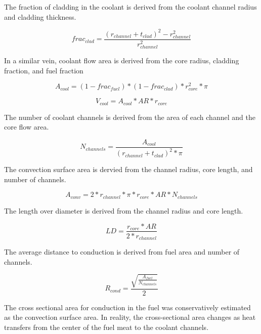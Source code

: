 The fraction of cladding in the coolant is derived from the coolant channel
radius and cladding thickness.

\begin{equation}
    frac_{clad} = \frac{(r_{channel} + t_{clad})^2 - r_{channel}^2}{r_{channel}^2} 
\end{equation}

In a similar vein, coolant flow area is derived from the core radius, cladding
fraction, and fuel fraction

\begin{equation}
    A_{cool} = (1-frac_{fuel})*(1-frac_{clad})*r_{core}^2*\pi
\end{equation}

\begin{equation}
    V_{cool} = A_{cool}*AR*r_{core}
\end{equation}

The number of coolant channels is derived from the area of each channel and the
core flow area.

\begin{equation}
    N_{channels} = \frac{A_{cool}}{(r_{channel} + t_{clad})^2 * \pi}
\end{equation}

The convection surface area is dervied from the channel radius, core length, and
number of channels.

\begin{equation}
    A_{conv} = 2*r_{channel}*\pi*r_{core}*AR*N_{channels}    
\end{equation}

The length over diameter is derived from the channel radius and core length.

\begin{equation}
    LD = \frac{r_{core}*AR}{2*r_{channel}}
\end{equation}

The average distance to conduction is derived from fuel area and number of
channels.

\begin{equation}
    R_{cond} = \frac{\sqrt{\frac{A_{fuel}}{N_{channels}}}}{2}
    \label{r_cond}
\end{equation}

The cross sectional area for conduction in the fuel was conservatively estimated
as the convection surface area. In reality, the cross-sectional area changes as
heat transfers from the center of the fuel meat to the coolant channels.


